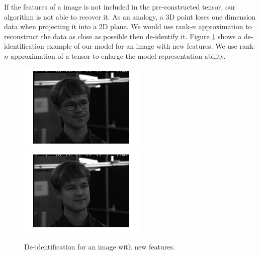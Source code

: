     If the features of a image is not included in the pre-constructed tensor, our algorithm
    is not able to recover it. As an analogy, a 3D point loses one dimension data when projecting
    it into a 2D plane. We would use rank-$n$ approximation to reconstruct the data as close as
    possible then de-identify it. 
    Figure \ref{fig:glass_deidentify} 
    shows a de-identification example of our model for an image with new features.
    We use rank-$n$ approximation of a tensor to enlarge 
    the model representation ability.
    \begin{figure}[htb]
      
      \centering  
      \includegraphics[width=60mm]{figure/61-1-2-o}
      \includegraphics[width=60mm]{figure/61-1-2}

    \caption{De-identification for an image with new features.}
    \label{fig:glass_deidentify}
    \end{figure}

